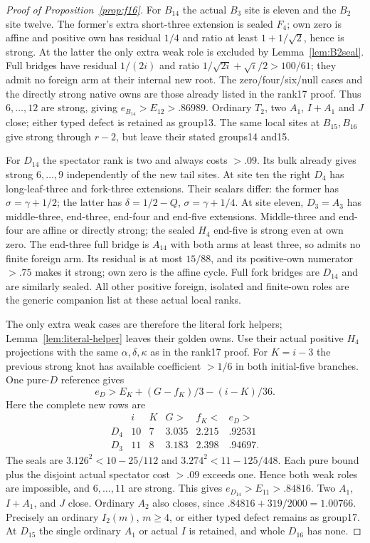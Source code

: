 \documentclass[11pt]{article}
\begin{document}
\begin{proof}[Proof of Proposition~\ref{prop:f16}]
For $B_{14}$ the actual $B_3$ site is eleven and the $B_2$ site
twelve. The former's extra short-three extension is sealed $F_4$;
own zero is affine and positive own has residual $1/4$ and ratio
at least $1+1/\sqrt2$, hence is strong. At the latter the only extra
weak role is excluded by Lemma~\ref{lem:B2seal}. Full bridges have
residual $1/(2i)$ and ratio
$1/\sqrt{2i}+\sqrt i/2>100/61$; they admit no foreign arm at
their internal new root. The zero/four/six/null cases and the directly
strong native owns are those already listed in the rank17 proof.
Thus $6,\ldots,12$ are strong, giving $e_{B_{14}}>E_{12}>.86989$.
Ordinary $T_2$, two $A_1$, $I+A_1$ and $J$ close; either typed
defect is retained as group13. The same local sites at $B_{15},B_{16}$
give strong through $r-2$, but leave their stated groups14 and15.

For $D_{14}$ the spectator rank is two and always costs $>.09$.
Its bulk already gives strong $6,\ldots,9$ independently of the
new tail sites. At site ten the right $D_4$ has long-leaf-three and
fork-three extensions. Their scalars differ: the former has
$\sigma=\gamma+1/2$; the latter has
$\delta=1/2-Q$, $\sigma=\gamma+1/4$.
At site eleven, $D_3=A_3$ has middle-three, end-three, end-four and
end-five extensions. Middle-three and end-four are affine or directly
strong; the sealed $H_4$ end-five is strong even at own zero.
The end-three full bridge is $A_{14}$ with both arms at least three,
so admits no finite foreign arm. Its residual is at most $15/88$,
and its positive-own numerator $>.75$ makes it strong; own zero is
the affine cycle. Full fork bridges are $D_{14}$ and are similarly
sealed. All other positive foreign, isolated and finite-own roles are
the generic companion list at these actual local ranks.

The only extra weak cases are therefore the literal fork helpers;
Lemma~\ref{lem:literal-helper} leaves their golden owns.
Use their actual positive $H_4$ projections with the same
$\alpha,\delta,\kappa$ as in the rank17 proof. For $K=i-3$ the
previous strong knot has available coefficient $>1/6$ in both
initial-five branches. One pure-$D$ reference gives
\[
 e_D>E_K+(G-f_K)/3-(i-K)/36.
\]
Here the complete new rows are
\[
\begin{array}{c|rrrr|c}
 &i&K&G>&f_K<&e_D>\\\hline
D_4&10&7&3.035&2.215&.92531\\
D_3&11&8&3.183&2.398&.94697.
\end{array}
\]
The seals are $3.126^2<10-25/112$ and
$3.274^2<11-125/448$. Each pure bound plus the disjoint actual
spectator cost $>.09$ exceeds one. Hence both weak roles are
impossible, and $6,\ldots,11$ are strong. This gives
$e_{D_{14}}>E_{11}>.84816$.
Two $A_1$, $I+A_1$, and $J$ close. Ordinary $A_2$ also closes,
since $.84816+319/2000=1.00766$.
Precisely an ordinary $I_2(m)$, $m\ge4$, or either typed defect
remains as group17. At $D_{15}$ the single ordinary $A_1$ or
actual $I$ is retained, and whole $D_{16}$ has none.


\end{proof}
\end{document}
